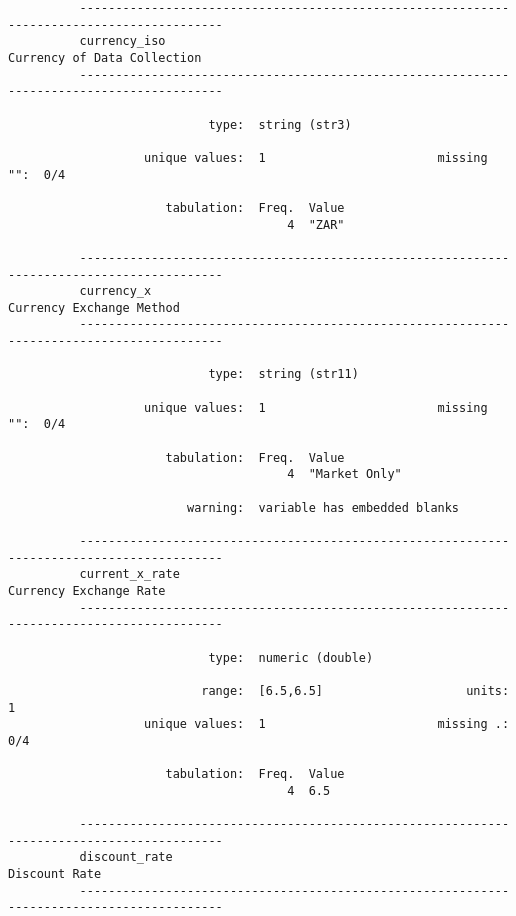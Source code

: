 \documentclass{article}
\begin{document}
\begin{verbatim}
          ------------------------------------------------------------------------------------------
          currency_iso                                                   Currency of Data Collection
          ------------------------------------------------------------------------------------------
          
                            type:  string (str3)
          
                   unique values:  1                        missing "":  0/4
          
                      tabulation:  Freq.  Value
                                       4  "ZAR"
          
          ------------------------------------------------------------------------------------------
          currency_x                                                        Currency Exchange Method
          ------------------------------------------------------------------------------------------
          
                            type:  string (str11)
          
                   unique values:  1                        missing "":  0/4
          
                      tabulation:  Freq.  Value
                                       4  "Market Only"
          
                         warning:  variable has embedded blanks
          
          ------------------------------------------------------------------------------------------
          current_x_rate                                                      Currency Exchange Rate
          ------------------------------------------------------------------------------------------
          
                            type:  numeric (double)
          
                           range:  [6.5,6.5]                    units:  1
                   unique values:  1                        missing .:  0/4
          
                      tabulation:  Freq.  Value
                                       4  6.5
          
          ------------------------------------------------------------------------------------------
          discount_rate                                                                Discount Rate
          ------------------------------------------------------------------------------------------
          

\end{verbatim}
\end{document}
